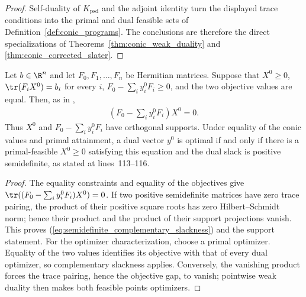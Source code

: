 \begin{proof}
    \leanok
    Self-duality of $K_{\mathrm{psd}}$ and the adjoint identity turn the
    displayed trace conditions into the primal and dual feasible sets of
    Definition~\ref{def:conic_programs}.  The conclusions are therefore the
    direct specializations of Theorems~\ref{thm:conic_weak_duality} and
    \ref{thm:conic_corrected_slater}.
\end{proof}

\begin{theorem}
    \label{thm:semidefinite_complementary_slackness}
    \leanok
    Let $b\in\R^n$ and let $F_0,F_1,\ldots,F_n$ be Hermitian matrices.
    Suppose that $X^0\geq0$, $\tr(F_iX^0)=b_i$ for every $i$,
    $F_0-\sum_i y_i^0F_i\geq0$, and the two objective values are equal.
    Then, as in
    \cite[Chapter~4, equation~(4.4)]{Wolf2012Quantum},
    \begin{align}
        \left(F_0-\sum_i y_i^0F_i\right)X^0=0.
        \label{eq:semidefinite_complementary_slackness}
    \end{align}
    Thus $X^0$ and $F_0-\sum_i y_i^0F_i$ have orthogonal supports.
    Under equality of the conic values and primal attainment, a dual vector
    $y^0$ is optimal if and only if there is a primal-feasible $X^0\geq0$
    satisfying this equation and the dual slack is positive semidefinite, as
    stated at lines~113--116.
\end{theorem}

\begin{proof}
    \leanok
    The equality constraints and equality of the objectives give
    $\tr((F_0-\sum_i y_i^0F_i)X^0)=0$.  If two positive semidefinite matrices
    have zero trace pairing, the product of their positive square roots has
    zero Hilbert--Schmidt norm; hence their product and the product of their
    support projections vanish.  This proves
    (\ref{eq:semidefinite_complementary_slackness}) and the support statement.
    For the optimizer characterization, choose a primal optimizer.  Equality
    of the two values identifies its objective with that of every dual
    optimizer, so complementary slackness applies.  Conversely, the vanishing
    product forces the trace pairing, hence the objective gap, to vanish;
    pointwise weak duality then makes both feasible points optimizers.
\end{proof}
